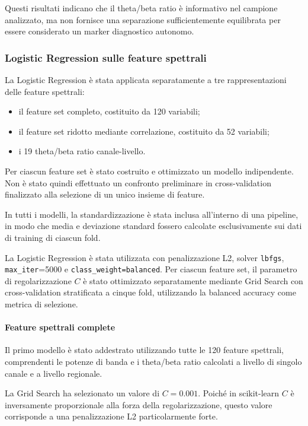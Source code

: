 Questi risultati indicano che il theta/beta ratio è informativo nel
campione analizzato, ma non fornisce una separazione sufficientemente
equilibrata per essere considerato un marker diagnostico autonomo.

\subsubsection{Logistic Regression sulle feature spettrali}

La Logistic Regression è stata applicata separatamente a tre
rappresentazioni delle feature spettrali:

\begin{itemize}
	\item il feature set completo, costituito da 120 variabili;
	\item il feature set ridotto mediante correlazione, costituito da
	52 variabili;
	\item i 19 theta/beta ratio canale-livello.
\end{itemize}

Per ciascun feature set è stato costruito e ottimizzato un modello
indipendente. Non è stato quindi effettuato un confronto preliminare
in cross-validation finalizzato alla selezione di un unico insieme
di feature.

In tutti i modelli, la standardizzazione è stata inclusa all'interno
di una pipeline, in modo che media e deviazione standard fossero
calcolate esclusivamente sui dati di training di ciascun fold.

La Logistic Regression è stata utilizzata con penalizzazione L2,
solver \texttt{lbfgs}, \texttt{max\_iter}=5000 e
\texttt{class\_weight=balanced}. Per ciascun feature set, il
parametro di regolarizzazione $C$ è stato ottimizzato separatamente
mediante Grid Search con cross-validation stratificata a cinque fold,
utilizzando la balanced accuracy come metrica di selezione.


\paragraph{Feature spettrali complete}

Il primo modello è stato addestrato utilizzando tutte le 120 feature
spettrali, comprendenti le potenze di banda e i theta/beta ratio
calcolati a livello di singolo canale e a livello regionale.

La Grid Search ha selezionato un valore di $C=0.001$. Poiché in
scikit-learn $C$ è inversamente proporzionale alla forza della
regolarizzazione, questo valore corrisponde a una penalizzazione L2
particolarmente forte.

